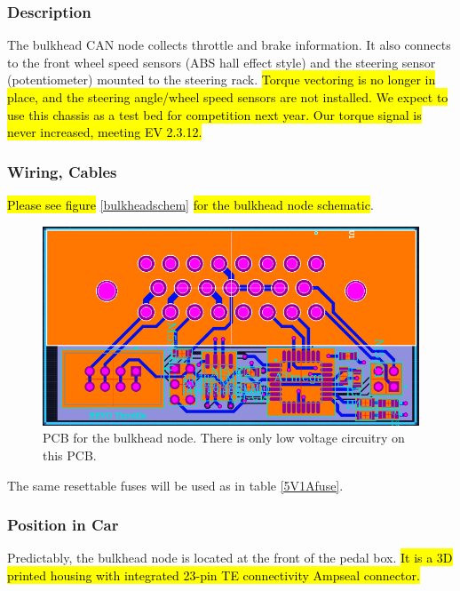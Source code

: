 \documentclass{article}
\DeclareRobustCommand{\hlr}[1]{{\sethlcolor{red}\hl{#1}}}
\begin{document}
            \subsubsection{Description}

            The bulkhead CAN node collects throttle and brake information. It also connects to the front wheel speed sensors (ABS hall effect style) and the steering sensor (potentiometer) mounted to the steering rack. \hlr{Torque vectoring is no longer in place, and the steering angle/wheel speed sensors are not installed. We expect to use this chassis as a test bed for competition next year. Our torque signal is never increased, meeting EV 2.3.12. }

            \subsubsection{Wiring, Cables}

            \hlr{Please see figure} \ref{bulkheadschem} \hlr{for the bulkhead node schematic}.

            \begin{figure}[H]
            \centering
            \includegraphics[width = 0.8 \textwidth]{throttlePCB}
            \caption{PCB for the bulkhead node. There is only low voltage circuitry on this PCB.}
            \label{throttlePCB}
            \end{figure}

            The same resettable fuses will be used as in table \ref{5V1Afuse}.

            \subsubsection{Position in Car}

            Predictably, the bulkhead node is located at the front of the pedal box. \hlr{It is a 3D printed housing with integrated 23-pin TE connectivity Ampseal connector.}
\end{document}
